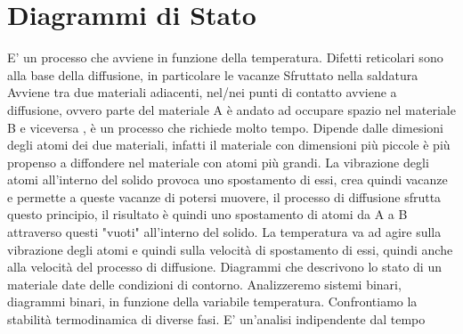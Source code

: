 \documentclass{article}%
\begin{document}
\section{ Diagrammi di Stato }%
\label{sec:DiagrammidiStato}%
E' un processo che avviene in funzione della temperatura.\newline%
%
Difetti reticolari sono alla base della diffusione, in particolare le vacanze\newline%
%
Sfruttato nella saldatura\newline%
%
Avviene tra due materiali adiacenti, nel/nei punti di contatto avviene a diffusione, ovvero parte del materiale A è andato ad occupare spazio nel materiale B e viceversa , è un processo che richiede molto tempo.\newline%
%
Dipende dalle dimesioni degli atomi dei due materiali, infatti il materiale con dimensioni più piccole è più  propenso a diffondere nel materiale con atomi più grandi.\newline%
%
La vibrazione degli atomi all'interno del solido provoca uno spostamento di essi, crea quindi vacanze e permette a queste vacanze di potersi muovere, il processo di diffusione sfrutta questo principio, il risultato è quindi uno spostamento di atomi da A a B attraverso questi "vuoti" all'interno del solido.\newline%
%
La temperatura va ad agire sulla vibrazione degli atomi e quindi sulla velocità di spostamento di essi, quindi anche alla velocità del processo di diffusione.\newline%
%
\newline%
%
\newline%
%
Diagrammi che descrivono lo stato di un materiale date delle condizioni di contorno.\newline%
%
Analizzeremo sistemi binari, diagrammi binari, in funzione della variabile temperatura.\newline%
%
Confrontiamo la stabilità termodinamica di diverse fasi.\newline%
%
E' un'analisi indipendente dal tempo\newline%
%
\newline%
%
\end{document}
